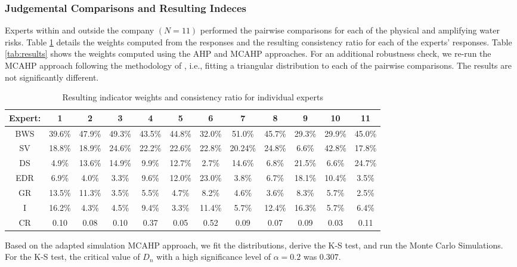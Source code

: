 \documentclass[a4paper]{article}
\begin{document}
\subsubsection{Judgemental Comparisons and Resulting Indeces}
Experts within and outside the company $(N=11)$ performed the pairwise comparisons for each of the physical and amplifying water risks. 
Table \ref{tab:responses} details the weights computed from the responses and the resulting consistency ratio for each of the experts' responses. 
Table \ref{tab:results} shows the weights computed using the AHP and MCAHP approaches.
For an additional robustness check, we re-run the MCAHP approach following the methodology of \citep{Ataei:2013}, i.e., fitting a triangular distribution to each of the pairwise comparisons. 
The results are not significantly different. 

\begin{table}[t b h]
\caption{Resulting indicator weights and consistency ratio for individual experts}
\centering
\resizebox{15cm}{!} {
\begin{tabular} {c c c c c c c c c c c c} \\ 
\toprule
Expert: & 1 & 2 & 3 & 4 & 5 & 6 & 7 & 8 & 9 & 10 & 11\\
\midrule 	
BWS	& 39.6\% & 47.9\% & 49.3\% & 43.5\% & 44.8\% & 32.0\% & 51.0\% & 45.7\% & 29.3\% & 29.9\% & 45.0\% \\
SV	& 18.8\% & 18.9\% & 24.6\% & 22.2\% & 22.6\% & 22.8\% & 20.24\% & 24.8\% & 6.6\% & 42.8\% & 17.8\% \\
DS	& 4.9\% & 13.6\% & 14.9\% & 9.9\% & 12.7\% & 2.7\% & 14.6\% & 6.8\% & 21.5\% & 6.6\% & 24.7\%\\
EDR	& 6.9\% & 4.0\% & 3.3\% & 9.6\% & 12.0\% & 23.0\% & 3.8\% & 6.7\% & 18.1\% & 10.4\% & 3.5\%\\
GR	& 13.5\% & 11.3\% & 3.5\% & 5.5\% & 4.7\% & 8.2\% & 4.6\% & 3.6\% & 8.3\% & 5.7\% & 2.5\% \\
I	& 16.2\% & 4.3\% & 4.5\% & 9.4\% & 3.3\% & 11.4\% & 5.7\% & 12.4\% & 16.3\% & 5.7\% & 6.4\%\\
\midrule 	
CR	& 0.10 & 0.08 & 0.10 & 0.37 & 0.05 & 0.52 & 0.09 & 0.07 & 0.09 & 0.03 & 0.11\\
\bottomrule
\end{tabular}
\label{tab:responses}
}
\end{table} 


Based on the adapted simulation MCAHP approach, we fit the distributions, derive the K-S test, and run the Monte Carlo Simulations. 
 For the K-S test, the critical value of $D_n$ with a high significance level of $\alpha=0.2$ was $0.307$.
\end{document}
